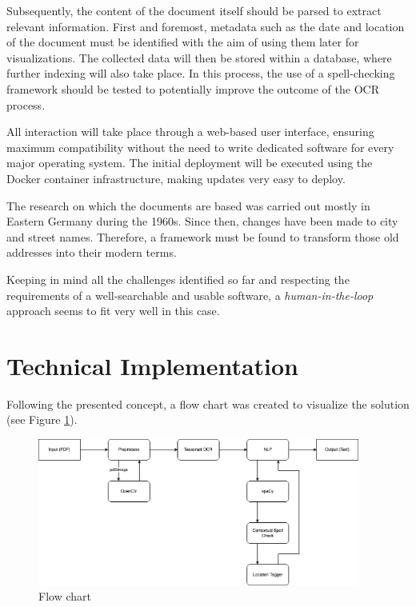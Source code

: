 \documentclass[12pt]{article}
\begin{document}
Subsequently, the content of the document itself should be parsed to extract relevant information. First and foremost, metadata such as the date and location of the document must be identified with the aim of using them later for visualizations. The collected data will then be stored within a database, where further indexing will also take place. In this process, the use of a spell-checking framework should be tested to potentially improve the outcome of the OCR process.

All interaction will take place through a web-based user interface, ensuring maximum compatibility without the need to write dedicated software for every major operating system. The initial deployment will be executed using the Docker container infrastructure, making updates very easy to deploy.

The research on which the documents are based was carried out mostly in Eastern Germany during the 1960s. Since then, changes have been made to city and street names. Therefore, a framework must be found to transform those old addresses into their modern terms.

Keeping in mind all the challenges identified so far and respecting the requirements of a well-searchable and usable software, a \textit{human-in-the-loop} approach seems to fit very well in this case.

\section{Technical Implementation}
\label{sec:implementation}

Following the presented concept, a flow chart was created to visualize the solution (see Figure \ref{fig:flow-chart}).

\begin{figure}[ht]
    \centering
    \includegraphics[width=400px]{terrasearch-flow-chart.drawio.png}
    \caption{Flow chart}
    \label{fig:flow-chart}
\end{figure}
\end{document}
